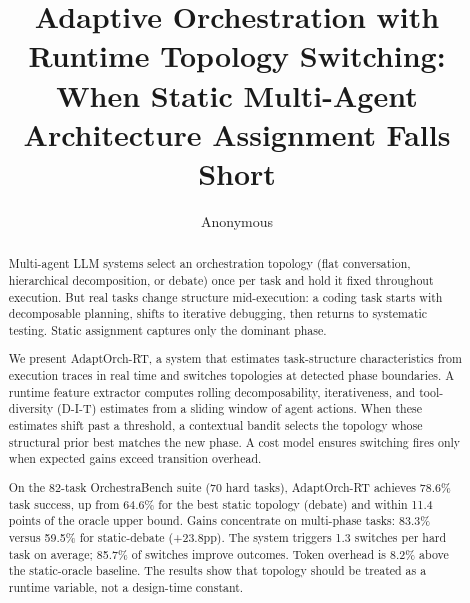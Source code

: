 \documentclass{article}
\title{Adaptive Orchestration with Runtime Topology Switching:\\When Static Multi-Agent Architecture Assignment Falls Short}
\author{Anonymous}
\begin{document}
\maketitle

\begin{abstract}
Multi-agent LLM systems select an orchestration topology (flat conversation, hierarchical decomposition, or debate) once per task and hold it fixed throughout execution. But real tasks change structure mid-execution: a coding task starts with decomposable planning, shifts to iterative debugging, then returns to systematic testing. Static assignment captures only the dominant phase.

We present AdaptOrch-RT, a system that estimates task-structure characteristics from execution traces in real time and switches topologies at detected phase boundaries. A runtime feature extractor computes rolling decomposability, iterativeness, and tool-diversity (D-I-T) estimates from a sliding window of agent actions. When these estimates shift past a threshold, a contextual bandit selects the topology whose structural prior best matches the new phase. A cost model ensures switching fires only when expected gains exceed transition overhead.

On the 82-task OrchestraBench suite (70 hard tasks), AdaptOrch-RT achieves 78.6\% task success, up from 64.6\% for the best static topology (debate) and within 11.4 points of the oracle upper bound. Gains concentrate on multi-phase tasks: 83.3\% versus 59.5\% for static-debate (+23.8pp). The system triggers 1.3 switches per hard task on average; 85.7\% of switches improve outcomes. Token overhead is 8.2\% above the static-oracle baseline. The results show that topology should be treated as a runtime variable, not a design-time constant.
\end{abstract}










\end{document}
